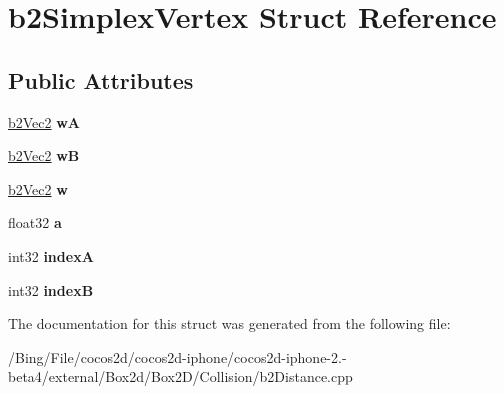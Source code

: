 \hypertarget{structb2_simplex_vertex}{\section{b2\-Simplex\-Vertex Struct Reference}
\label{structb2_simplex_vertex}
}
\subsection*{Public Attributes}
\begin{DoxyCompactItemize}
\item 
\hypertarget{structb2_simplex_vertex_a35098ec42d2615c7dc6d645e4a7c0674}{\hyperlink{structb2_vec2}{b2\-Vec2} {\bfseries w\-A}}\label{structb2_simplex_vertex_a35098ec42d2615c7dc6d645e4a7c0674}

\item 
\hypertarget{structb2_simplex_vertex_a73d6b5be3648a293b103d559e9d03534}{\hyperlink{structb2_vec2}{b2\-Vec2} {\bfseries w\-B}}\label{structb2_simplex_vertex_a73d6b5be3648a293b103d559e9d03534}

\item 
\hypertarget{structb2_simplex_vertex_a32e374d7bbb6d8a0589a91bd3de3029f}{\hyperlink{structb2_vec2}{b2\-Vec2} {\bfseries w}}\label{structb2_simplex_vertex_a32e374d7bbb6d8a0589a91bd3de3029f}

\item 
\hypertarget{structb2_simplex_vertex_ace99ab00d1d83a7290d283f73671e594}{float32 {\bfseries a}}\label{structb2_simplex_vertex_ace99ab00d1d83a7290d283f73671e594}

\item 
\hypertarget{structb2_simplex_vertex_ac53c648f53d28391aaff758d99a7868d}{int32 {\bfseries index\-A}}\label{structb2_simplex_vertex_ac53c648f53d28391aaff758d99a7868d}

\item 
\hypertarget{structb2_simplex_vertex_a0c25e5f713707356122e91bd20e4f40c}{int32 {\bfseries index\-B}}\label{structb2_simplex_vertex_a0c25e5f713707356122e91bd20e4f40c}

\end{DoxyCompactItemize}


The documentation for this struct was generated from the following file\-:\begin{DoxyCompactItemize}
\item 
/\-Bing/\-File/cocos2d/cocos2d-\/iphone/cocos2d-\/iphone-\/2.-\/beta4/external/\-Box2d/\-Box2\-D/\-Collision/b2\-Distance.\-cpp\end{DoxyCompactItemize}
